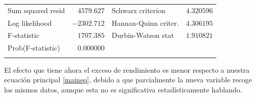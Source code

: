 \documentclass[12pt]{article}
\numberwithin{equation}{section} %
\begin{document}
\begin{table}[H]
\begin{tabular}{lrrrr}
\multicolumn{1}{l}{Sum squared resid}&\multicolumn{1}{r}{$4579.627$}&\multicolumn{2}{l}{Schwarz criterion}&\multicolumn{1}{r}{$4.320596$}\\
\multicolumn{1}{l}{Log likelihood}&\multicolumn{1}{r}{$-2302.712$}&\multicolumn{2}{l}{Hannan-Quinn criter.}&\multicolumn{1}{r}{$4.306195$}\\
\multicolumn{1}{l}{F-statistic}&\multicolumn{1}{r}{$1707.385$}&\multicolumn{2}{l}{Durbin-Watson stat}&\multicolumn{1}{r}{$1.910821$}\\
\multicolumn{1}{l}{Prob(F-statistic)}&\multicolumn{1}{r}{$0.000000$}&\multicolumn{1}{c}{}&\multicolumn{1}{c}{}&\multicolumn{1}{c}{}\\
[4.5pt] \hline \\ [-4.5pt]
\end{tabular}
\end{table}

El efecto que tiene ahora el exceso de rendimiento es menor respecto a nuestra ecuación principal \eqref{maineq}, debido a que parcialmente la nueva variable recoge los mismos datos, aunque esta no es significativa estadísticamente hablando.
\end{document}
